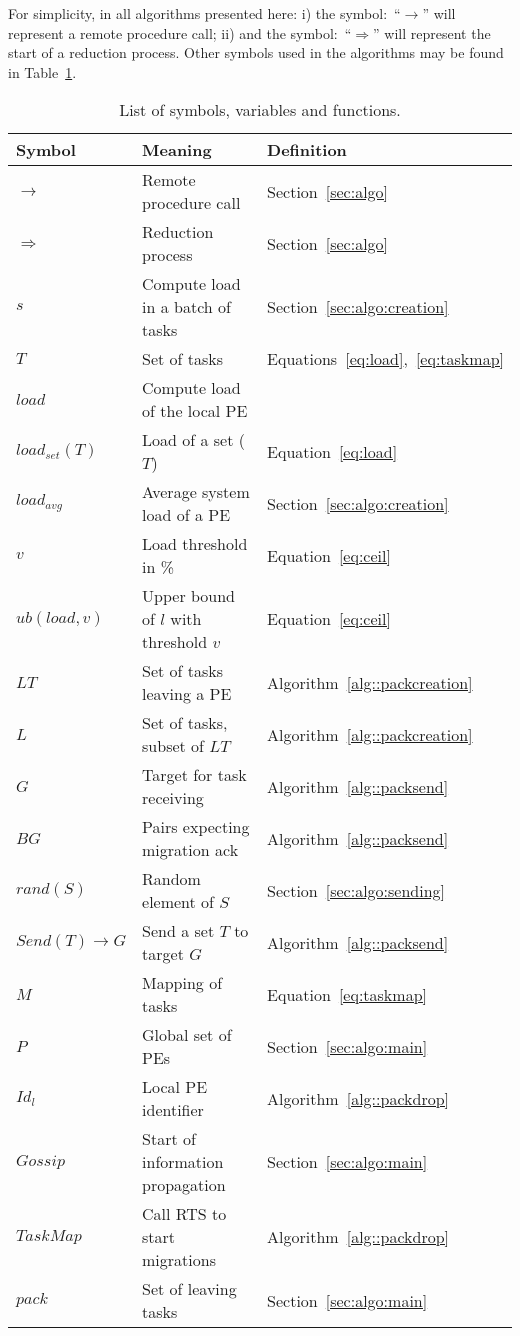 For simplicity, in all algorithms presented here: i) the symbol:~``$\rightarrow$'' will represent a remote procedure call; ii) and the symbol:~``$\Rightarrow$'' will  represent the start of a reduction process.
Other symbols used in the algorithms may be found in Table~\ref{tab:algo:symbols}.


\begin{table}
	\caption{List of symbols, variables and functions.}
	\begin{tabular}{l | l | l }
		Symbol & Meaning & Definition\\ \hline
		$\rightarrow$ 	& Remote procedure call &  Section~\ref{sec:algo} \\
		$\Rightarrow$ 	& Reduction process & Section~\ref{sec:algo} \\
		$s$			  	& Compute load in a batch of tasks & Section~\ref{sec:algo:creation} \\
		$T$				& Set of tasks 										& Equations~\ref{eq:load},~\ref{eq:taskmap} \\
		$load$			& Compute load of the local PE \\
		$load_{set}(T)$	& Load of a set ($T$) 								& Equation~\ref{eq:load} \\
		$load_{avg}$		& Average system load of a PE 						& Section~\ref{sec:algo:creation}\\
		$v$				& Load threshold in \% 								& Equation~\ref{eq:ceil} \\
		$ub(load,v)$		& Upper bound of $l$ with threshold $v$		 		& Equation~\ref{eq:ceil} \\ 
		$LT$				& Set of tasks leaving a PE 						& Algorithm~\ref{alg::packcreation} \\
		$L$				& Set of tasks, subset of $LT$						& Algorithm~\ref{alg::packcreation} \\
		$G$				& Target for task receiving							& Algorithm~\ref{alg::packsend} \\
		$BG$				& Pairs expecting migration ack						& Algorithm~\ref{alg::packsend} \\ 
		$rand(S)$		& Random element of $S$ 							& Section~\ref{sec:algo:sending} \\
		$Send(T)\rightarrow G $ & Send a set $T$ to target $G$				& Algorithm~\ref{alg::packsend} \\ 
		$M$				& Mapping of tasks									& Equation~\ref{eq:taskmap} \\
		$P$				& Global set of PEs 								& Section~\ref{sec:algo:main} \\
		$Id_l$ 			& Local PE identifier								& Algorithm~\ref{alg::packdrop} \\
		$Gossip$			& Start of information propagation					& Section~\ref{sec:algo:main} \\
		$TaskMap$		& Call RTS to start migrations						& Algorithm~\ref{alg::packdrop} \\
		$pack$			& Set of leaving tasks								& Section~\ref{sec:algo:main} \\
	\end{tabular}
	\label{tab:algo:symbols}
\end{table}

